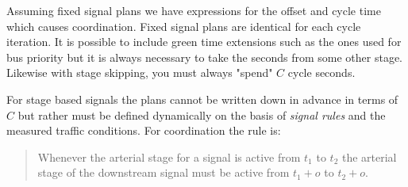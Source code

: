 Assuming fixed signal plans we have expressions for the offset and cycle time which causes coordination. Fixed signal plans are identical for each cycle iteration. It is possible to include green time extensions such as the ones used for bus priority but it is always necessary to take the seconds from some other stage. Likewise with stage skipping, you must always "spend" $C$ cycle seconds.

For stage based signals the plans cannot be written down in advance in terms of $C$ but rather must be defined dynamically on the basis of \textit{signal rules} and the measured traffic conditions. For coordination the rule is:

\begin{quote}
Whenever the arterial stage for a signal is active from $t_1$ to $t_2$ the arterial stage of the downstream signal must be active from $t_1 + o$ to $t_2 + o$.
\end{quote}

